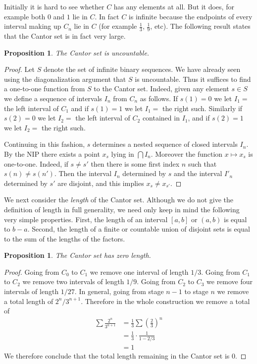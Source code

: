 \documentclass[11pt,oneside]{amsbook}
\theoremstyle{definition}
\theoremstyle{plain}
\newtheorem{proposition}[theorem]{Proposition}
\theoremstyle{definition}
\theoremstyle{remark}
\numberwithin{equation}{section}
\numberwithin{figure}{section}
\begin{document}
Initially it is hard to see whether $C$ has any elements at all. But it does, for example both $0$ and $1$ lie in $C$. In fact $C$ is infinite because the endpoints of every interval making up $C_n$ lie in $C$ (for example $\frac13$, $\frac19$, etc). The following result states that the Cantor set is in fact very large.

\begin{proposition}
  The Cantor set is uncountable.
\end{proposition}

\begin{proof}
  Let $S$ denote the set of infinite binary sequences. We have already seen using the diagonalization argument that $S$ is uncountable. Thus it suffices to find a one-to-one function from $S$ to the Cantor set. Indeed, given any element $s\in S$ we define a sequence of intervals $I_n$ from $C_n$ as follows. If $s(1)=0$ we let $I_1=$ the left interval of $C_1$ and if $s(1)=1$ we let $I_1=$ the right such. Similarly if $s(2)=0$ we let $I_2=$ the left interval of $C_2$ contained in $I_1$, and if $s(2)=1$ we let $I_2=$ the right such.

  Continuing in this fashion, $s$ determines a nested sequence of closed intervals $I_n$. By the NIP there exists a point $x_s$ lying in $\bigcap I_n$. Moreover the function $x\mapsto x_s$ is one-to-one. Indeed, if $s\neq s'$ then there is some first index $n$ such that $s(n)\neq s(n')$. Then the interval $I_n$ determined by $s$ and the interval $I'_n$ determined by $s'$ are disjoint, and this implies $x_s\neq x_{s'}$.
\end{proof}

We next consider the \emph{length} of the Cantor set. Although we do not give the definition of length in full generality, we need only keep in mind the following very simple properties. First, the length of an interval $[a,b]$ or $(a,b)$ is equal to $b-a$. Second, the length of a finite or countable union of disjoint sets is equal to the sum of the lengths of the factors.

\begin{proposition}
  The Cantor set has zero length.
\end{proposition}

\begin{proof}
  Going from $C_0$ to $C_1$ we remove one interval of length $1/3$. Going from $C_1$ to $C_2$ we remove two intervals of length $1/9$. Going from $C_2$ to $C_3$ we remove four intervals of length $1/27$. In general, going from stage $n-1$ to stage $n$ we remove a total length of $2^n/3^{n+1}$. Therefore in the whole construction we remove a total of
  \begin{align*}
    \sum\frac{2^n}{3^{n+1}}&=\frac13\sum\left(\frac23\right)^n\\
                           &=\frac13\cdot\frac{1}{1-2/3}\\
                           &=1
  \end{align*}
  We therefore conclude that the total length remaining in the Cantor set is $0$.
\end{proof}
\end{document}
